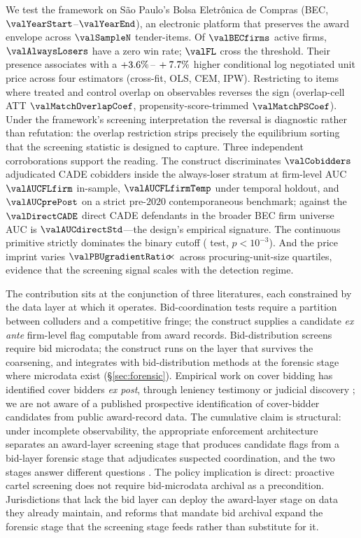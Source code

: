 We test the framework on São Paulo's Bolsa Eletrônica de Compras
(BEC, $\valYearStart$--$\valYearEnd$), an electronic platform
that preserves the award envelope across $\valSampleN$
tender-items. Of $\valBECfirms$ active firms, $\valAlwaysLosers$
have a zero win rate; $\valFL$ cross the threshold. Their
presence associates with a $+3.6\%\,\text{--}\,+7.7\%$ higher
conditional log negotiated unit price across four estimators
(cross-fit, OLS, CEM, IPW). Restricting to items where treated
and control overlap on observables reverses the sign
(overlap-cell ATT $\valMatchOverlapCoef$,
propensity-score-trimmed $\valMatchPSCoef$). Under the
framework's screening interpretation the reversal is diagnostic
rather than refutation: the overlap restriction strips
precisely the equilibrium sorting that the screening statistic
is designed to capture. Three independent corroborations support
the reading. The construct discriminates $\valCobidders$
adjudicated CADE cobidders inside the always-loser stratum at
firm-level AUC $\valAUCFLfirm$ in-sample, $\valAUCFLfirmTemp$
under temporal holdout, and $\valAUCprePost$ on a strict
pre-$2020$ contemporaneous benchmark; against the $\valDirectCADE$
direct CADE defendants in the broader BEC firm universe AUC is
$\valAUCdirectStd$---the design's empirical signature. The
continuous primitive strictly dominates the binary cutoff
(\citealt{delong1988comparing} test, $p<10^{-3}$). And the price
imprint varies $\valPBUgradientRatio\!\!\times$ across
procuring-unit-size quartiles, evidence that the screening
signal scales with the detection regime.

The contribution sits at the conjunction of three literatures,
each constrained by the data layer at which it operates.
Bid-coordination tests
\citep{bajari2003deciding,porter1993detection,conley2016detecting}
require a partition between colluders and a competitive fringe;
the construct supplies a candidate \emph{ex ante} firm-level
flag computable from award records. Bid-distribution screens
\citep{imhof2019detecting,wallimann2023machine} require bid
microdata; the construct runs on the layer that survives the
coarsening, and integrates with bid-distribution methods at the
forensic stage where microdata exist (§\ref{sec:forensic}).
Empirical work on cover bidding has identified cover bidders
\emph{ex post}, through leniency testimony or judicial discovery
\citep{porter1999ohio,pesendorfer2000study,asker2010leniency}; we
are not aware of a published prospective identification of
cover-bidder candidates from public award-record data. The
cumulative claim is structural: under incomplete observability,
the appropriate enforcement architecture separates an award-layer
screening stage that produces candidate flags from a bid-layer
forensic stage that adjudicates suspected coordination, and the
two stages answer different questions
\citep{becker1968crime,stigler1970optimum,harrington2008detecting}.
The policy implication is direct: proactive cartel screening
does not require bid-microdata archival as a precondition.
Jurisdictions that lack the bid layer can deploy the award-layer
stage on data they already maintain, and reforms that mandate
bid archival expand the forensic stage that the screening stage
feeds rather than substitute for it.

